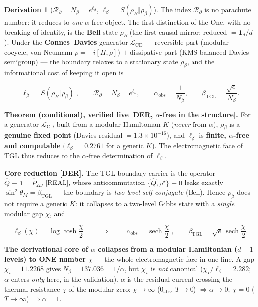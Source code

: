 \documentclass[11pt]{article}
\newcommand{\bTGL}{\beta_{\mathrm{TGL}}}\newcommand{\Msun}{M_{\odot}}\newcommand{\TGL}{\mathrm{TGL}}
\theoremstyle{definition}\newtheorem{deriv}{Derivation}
\begin{document}
\begin{deriv}[$\mathcal{R}_\partial=N_\beta=e^{\ell_\beta}$, $\ell_\beta=S(\rho_B\Vert\rho_\beta)$]

The index $\mathcal{R}_\partial$ is no parachute number: it reduces to \emph{one} $\alpha$-free object. The first distinction of the One, with no breaking of identity, is the \textbf{Bell} state $\rho_B$ (the first causal mirror; reduced $=\mathbf 1_d/d$). Under the \textbf{Connes--Davies} generator $\mathcal{L}_{\mathrm{CD}}$ --- reversible part (modular cocycle, von Neumann $\dot\rho=-i[H,\rho]$) $+$ dissipative part (KMS-balanced Davies semigroup) --- the boundary relaxes to a stationary state $\rho_\beta$, and the informational cost of keeping it open is

\begin{equation}\boxed{\;\ell_\beta=S(\rho_B\Vert\rho_\beta)\;},\qquad \mathcal{R}_\partial=N_\beta=e^{\ell_\beta},\qquad \alpha_{\mathrm{obs}}=\frac{1}{N_\beta},\qquad \bTGL=\frac{\sqrt e}{N_\beta}.\end{equation}

\textbf{Theorem (conditional), verified live \textsf{[DER, $\alpha$-free in the structure]}.} For a generator $\mathcal{L}_{\mathrm{CD}}$ built from a modular Hamiltonian $K$ (\emph{never} from $\alpha$), $\rho_\beta$ is a \textbf{genuine fixed point} (Davies residual $=1.3\times10^{-16}$), and $\ell_\beta$ is \textbf{finite, $\alpha$-free and computable} ($\ell_\beta=0.2761$ for a generic $K$). The electromagnetic face of TGL thus reduces to the $\alpha$-free determination of $\ell_\beta$.

\textbf{Core reduction \textsf{[DER]}.} The TGL boundary carrier is the operator $\hat Q=\mathbf 1-\hat P_{2D}$ \textsf{[REAL]}, whose anticommutation $\{\hat Q,\rho^\star\}=0$ leaks exactly $\sin^2\theta_M=\bTGL$ --- the boundary is \emph{two-level self-conjugate} (Bell). Hence $\rho_\beta$ does not require a generic $K$: it collapses to a two-level Gibbs state with a \emph{single} modular gap $\chi$, and

\begin{equation}\boxed{\;\ell_\beta(\chi)=\log\cosh\frac{\chi}{2}\;}\qquad\Longrightarrow\qquad\boxed{\;\alpha_{\mathrm{obs}}=\operatorname{sech}\frac{\chi}{2}\;},\qquad \bTGL=\sqrt e\,\operatorname{sech}\frac{\chi}{2}.\end{equation}

\textbf{The derivational core of $\alpha$ collapses from a modular Hamiltonian ($d-1$ levels) to ONE number $\chi$} --- the whole electromagnetic face in one line. A gap $\chi_\star=11.2268$ gives $N_\beta=137.036=1/\alpha$, but $\chi_\star$ is \emph{not} canonical ($\chi_\star/\ell_\beta=2.282$; $\alpha$ enters \emph{only} here, in the validation). $\alpha$ is the residual current crossing the thermal resistance $\chi$ of the modular zero: $\chi\to\infty$ ($0_{\mathrm{abs}}$, $T\to0$) $\Rightarrow\alpha\to0$; $\chi=0$ ($T\to\infty$) $\Rightarrow\alpha=1$.


\end{deriv}
\end{document}
